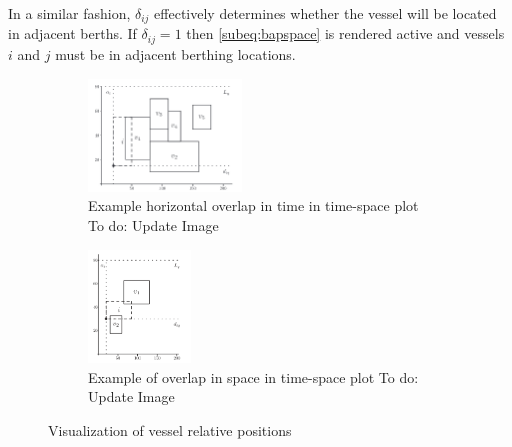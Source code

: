 \documentclass[letterpaper, 10pt, conference]{IEEEtran}
\newcommand{\TODO}[1]{{\color{green} To do: #1}} %
\begin{document}
In a similar fashion, \(\delta_{ij}\) effectively determines whether the vessel will be located in adjacent berths. If \(\delta_{ij} = 1\) then \eqref{subeq:bapspace} is rendered active and vessels \(i\) and \(j\) must be in adjacent berthing locations. 




\begin{figure}
    \centering
    \begin{subfigure}[b]{0.2\textwidth}
        \centering
    	\includegraphics[height=3cm]{hoizontaloverlap.png}
    	\caption{Example horizontal overlap in time in time-space plot\TODO{Update Image}}
    	\label{subfig:timeoverlap}
	\end{subfigure}
	\hfill
    \begin{subfigure}[b]{0.2\textwidth}
        \centering
    	\includegraphics[height=3cm]{verticaloverlap.png}
    	\caption{Example of overlap in space in time-space plot\TODO{Update Image}}
    	\label{subfig:spaceoverlap}
	\end{subfigure}
	\caption{Visualization of vessel relative positions}
	\label{fig:overlap}
\end{figure}
\end{document}
